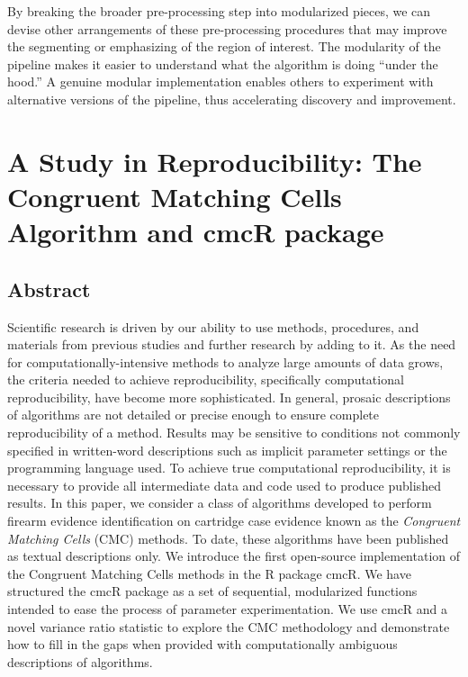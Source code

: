 \documentclass[11pt,]{isuthesis}
\begin{document}
By breaking the broader pre-processing step into modularized pieces, we can devise other arrangements of these pre-processing procedures that may improve the segmenting or emphasizing of the region of interest.
The modularity of the pipeline makes it easier to understand what the algorithm is doing ``under the hood.''
A genuine modular implementation enables others to experiment with alternative versions of the pipeline, thus accelerating discovery and improvement.

\hypertarget{a-study-in-reproducibility-the-congruent-matching-cells-algorithm-and-cmcr-package}{%
\chapter{A Study in Reproducibility: The Congruent Matching Cells Algorithm and cmcR package}\label{a-study-in-reproducibility-the-congruent-matching-cells-algorithm-and-cmcr-package}}

\hypertarget{abstract}{%
\section*{Abstract}\label{abstract}}

Scientific research is driven by our ability to use methods, procedures, and materials from previous studies and further research by adding to it.
As the need for computationally-intensive methods to analyze large amounts of data grows, the criteria needed to achieve reproducibility, specifically computational reproducibility, have become more sophisticated.
In general, prosaic descriptions of algorithms are not detailed or precise enough to ensure complete reproducibility of a method.
Results may be sensitive to conditions not commonly specified in written-word descriptions such as implicit parameter settings or the programming language used.
To achieve true computational reproducibility, it is necessary to provide all intermediate data and code used to produce published results.
In this paper, we consider a class of algorithms developed to perform firearm evidence identification on cartridge case evidence known as the \emph{Congruent Matching Cells} (CMC) methods.
To date, these algorithms have been published as textual descriptions only.
We introduce the first open-source implementation of the Congruent Matching Cells methods in the R package cmcR.
We have structured the cmcR package as a set of sequential, modularized functions intended to ease the process of parameter experimentation.
We use cmcR and a novel variance ratio statistic to explore the CMC methodology and demonstrate how to fill in the gaps when provided with computationally ambiguous descriptions of algorithms.
\end{document}
